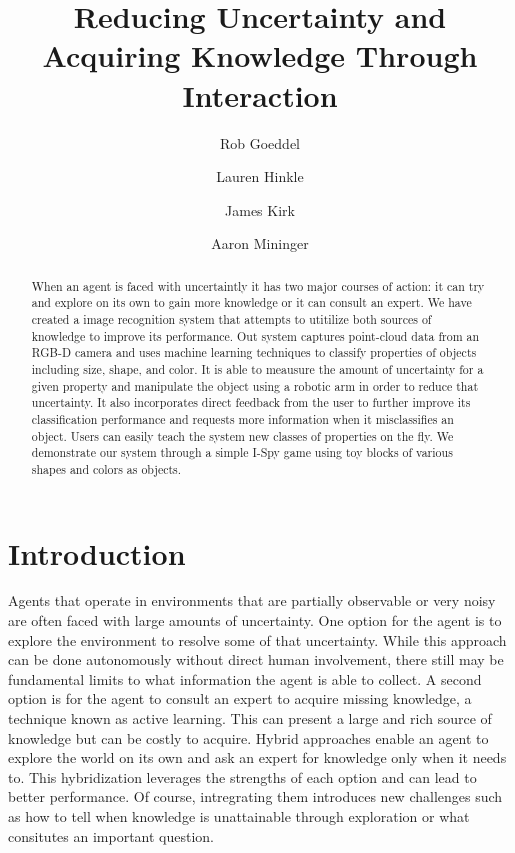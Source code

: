 \documentclass[11pt]{article}
\title{Reducing Uncertainty and Acquiring Knowledge Through Interaction}
\author{Rob Goeddel \and Lauren Hinkle \and James Kirk \and Aaron Mininger}
\date{}
\newcommand{\xxx}[1]{{\bf \color{red} #1}}
\begin{document}
\maketitle


\begin{abstract}
When an agent is faced with uncertaintly it has two major courses of action: it can try and explore on its own to gain more knowledge or it can consult an expert. We have created a image recognition system that attempts to utitilize both sources of knowledge to improve its performance. Out system captures point-cloud data from an RGB-D camera and uses machine learning techniques to classify properties of objects including size, shape, and color. It is able to meausure the amount of uncertainty for a given property and manipulate the object using a robotic arm in order to reduce that uncertainty. It also incorporates direct feedback from the user to further improve its classification performance and requests more information when it misclassifies an object. Users can easily teach the system new classes of properties on the fly. We demonstrate our system through a simple I-Spy game using toy blocks of various shapes and colors as objects. 
\end{abstract}


\section{Introduction}
Agents that operate in environments that are partially observable or very noisy are often faced with large amounts of uncertainty. One option for the agent is to explore the environment to resolve some of that uncertainty. While this approach can be done autonomously without direct human involvement, there still may be fundamental limits to what information the agent is able to collect. A second option is for the agent to consult an expert to acquire missing knowledge, a technique known as active learning. This can present a large and rich source of knowledge but can be costly to acquire. Hybrid approaches enable an agent to explore the world on its own and ask an expert for knowledge only when it needs to. This hybridization leverages the strengths of each option and can lead to better performance. Of course, intregrating them introduces new challenges such as how to tell when knowledge is unattainable through exploration or what consitutes an important question. 
\end{document}
